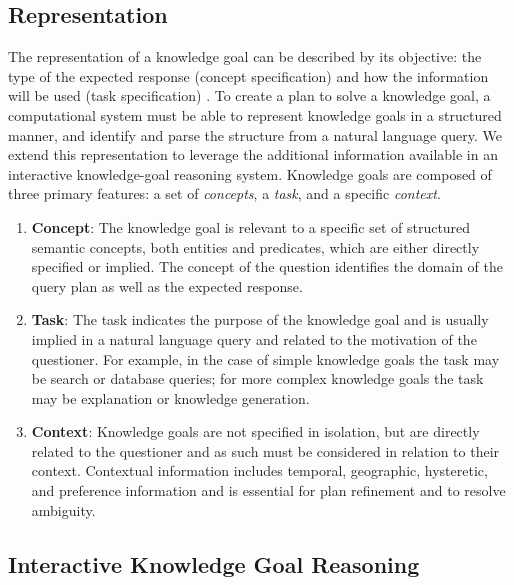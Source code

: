 \documentclass[letterpaper]{article}
\begin{document}
\subsection{Representation}

The representation of a knowledge goal can be described by its objective: the type of the expected response (concept specification) and how the information will be used (task specification) \cite{ram_theory_1991}. To create a plan to solve a knowledge goal, a computational system must be able to represent knowledge goals in a structured manner, and identify and parse the structure from a natural language query. We extend this representation to leverage the additional information available in an interactive knowledge-goal reasoning system. Knowledge goals are composed of three primary features: a set of \textit{concepts}, a \textit{task}, and a specific \textit{context}.

\begin{enumerate}

\item \textbf{Concept}: The knowledge goal is relevant to a specific set of structured semantic concepts, both entities and predicates, which are either directly specified or implied. The concept of the question identifies the domain of the query plan as well as the expected response.

\item \textbf{Task}: The task indicates the purpose of the knowledge goal and is usually implied in a natural language query and related to the motivation of the questioner. For example, in the case of simple knowledge goals the task may be search or database queries; for more complex knowledge goals the task may be explanation or knowledge generation.

\item \textbf{Context}: Knowledge goals are not specified in isolation, but are directly related to the questioner and as such must be considered in relation to their context. Contextual information includes temporal, geographic, hysteretic, and preference information and is essential for plan refinement and to resolve ambiguity.
\end{enumerate}

\subsection{Interactive Knowledge Goal Reasoning}
\end{document}
